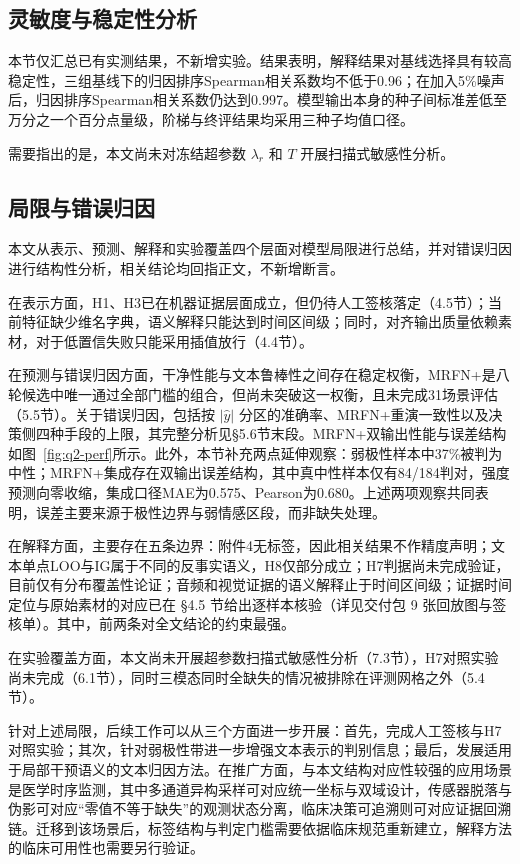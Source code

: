 \documentclass[colorprint,nocoverzero]{gmcmthesis}
\begin{document}
\subsection{灵敏度与稳定性分析}\label{q7-sens}\label{subsec:q7-sens}
本节仅汇总已有实测结果，不新增实验。结果表明，解释结果对基线选择具有较高稳定性，三组基线下的归因排序Spearman相关系数均不低于0.96；在加入5\%噪声后，归因排序Spearman相关系数仍达到0.997。模型输出本身的种子间标准差低至万分之一个百分点量级，阶梯与终评结果均采用三种子均值口径。

需要指出的是，本文尚未对冻结超参数 $\lambda_r$ 和 $T$ 开展扫描式敏感性分析。

\subsection{局限与错误归因}\label{sec:q7-limits}\label{subsec:q7-limits}
本文从表示、预测、解释和实验覆盖四个层面对模型局限进行总结，并对错误归因进行结构性分析，相关结论均回指正文，不新增断言。

在表示方面，H1、H3已在机器证据层面成立，但仍待人工签核落定（4.5节）；当前特征缺少维名字典，语义解释只能达到时间区间级；同时，对齐输出质量依赖素材，对于低置信失败只能采用插值放行（4.4节）。

在预测与错误归因方面，干净性能与文本鲁棒性之间存在稳定权衡，MRFN+是八轮候选中唯一通过全部门槛的组合，但尚未突破这一权衡，且未完成31场景评估（5.5节）。关于错误归因，包括按 $|\hat y|$ 分区的准确率、MRFN+重演一致性以及决策侧四种手段的上限，其完整分析见§5.6节末段。MRFN+双输出性能与误差结构如图~\ref{fig:q2-perf}所示。此外，本节补充两点延伸观察：弱极性样本中37\%被判为中性；MRFN+集成存在双输出误差结构，其中真中性样本仅有84/184判对，强度预测向零收缩，集成口径MAE为0.575、Pearson为0.680。上述两项观察共同表明，误差主要来源于极性边界与弱情感区段，而非缺失处理。

在解释方面，主要存在五条边界：附件4无标签，因此相关结果不作精度声明；文本单点LOO与IG属于不同的反事实语义，H8仅部分成立；H7判据尚未完成验证，目前仅有分布覆盖性论证；音频和视觉证据的语义解释止于时间区间级；证据时间定位与原始素材的对应已在 §4.5 节给出逐样本核验（详见交付包 9 张回放图与签核单）。其中，前两条对全文结论的约束最强。

在实验覆盖方面，本文尚未开展超参数扫描式敏感性分析（7.3节），H7对照实验尚未完成（6.1节），同时三模态同时全缺失的情况被排除在评测网格之外（5.4节）。

针对上述局限，后续工作可以从三个方面进一步开展：首先，完成人工签核与H7对照实验；其次，针对弱极性带进一步增强文本表示的判别信息；最后，发展适用于局部干预语义的文本归因方法。在推广方面，与本文结构对应性较强的应用场景是医学时序监测，其中多通道异构采样可对应统一坐标与双域设计，传感器脱落与伪影可对应“零值不等于缺失”的观测状态分离，临床决策可追溯则可对应证据回溯链。迁移到该场景后，标签结构与判定门槛需要依据临床规范重新建立，解释方法的临床可用性也需要另行验证。
\end{document}
